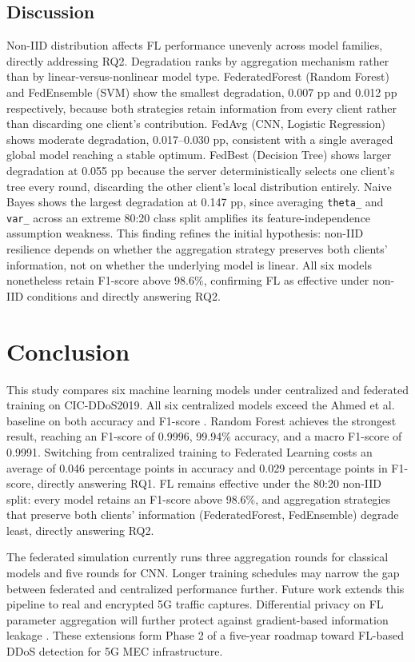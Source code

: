 \documentclass[conference, a4paper]{IEEEtran}
\begin{document}
\subsection{Discussion}

Non-IID distribution affects FL performance unevenly across model families, directly addressing RQ2. Degradation ranks by aggregation mechanism rather than by linear-versus-nonlinear model type. FederatedForest (Random Forest) and FedEnsemble (SVM) show the smallest degradation, 0.007 pp and 0.012 pp respectively, because both strategies retain information from every client rather than discarding one client's contribution. FedAvg (CNN, Logistic Regression) shows moderate degradation, 0.017--0.030 pp, consistent with a single averaged global model reaching a stable optimum. FedBest (Decision Tree) shows larger degradation at 0.055 pp because the server deterministically selects one client's tree every round, discarding the other client's local distribution entirely. Naive Bayes shows the largest degradation at 0.147 pp, since averaging \texttt{theta\_} and \texttt{var\_} across an extreme 80:20 class split amplifies its feature-independence assumption weakness. This finding refines the initial hypothesis: non-IID resilience depends on whether the aggregation strategy preserves both clients' information, not on whether the underlying model is linear. All six models nonetheless retain F1-score above 98.6\%, confirming FL as effective under non-IID conditions and directly answering RQ2.

\section{Conclusion}

This study compares six machine learning models under centralized and federated training on CIC-DDoS2019. All six centralized models exceed the Ahmed et al. baseline on both accuracy and F1-score \cite{b10}. Random Forest achieves the strongest result, reaching an F1-score of 0.9996, 99.94\% accuracy, and a macro F1-score of 0.9991. Switching from centralized training to Federated Learning costs an average of 0.046 percentage points in accuracy and 0.029 percentage points in F1-score, directly answering RQ1. FL remains effective under the 80:20 non-IID split: every model retains an F1-score above 98.6\%, and aggregation strategies that preserve both clients' information (FederatedForest, FedEnsemble) degrade least, directly answering RQ2.

The federated simulation currently runs three aggregation rounds for classical models and five rounds for CNN. Longer training schedules may narrow the gap between federated and centralized performance further. Future work extends this pipeline to real and encrypted 5G traffic captures. Differential privacy on FL parameter aggregation will further protect against gradient-based information leakage \cite{b12}. These extensions form Phase 2 of a five-year roadmap toward FL-based DDoS detection for 5G MEC infrastructure.
\end{document}
